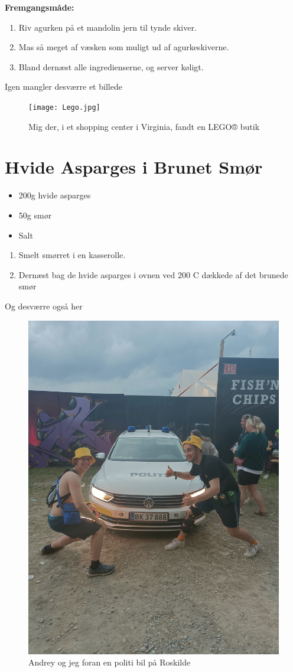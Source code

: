 \documentclass{book}
\begin{document}
\begin{minipage}[t]{0.5\textwidth}
\textbf{Fremgangsmåde:}
\begin{enumerate}
    \item Riv agurken på et mandolin jern til tynde skiver.
    \item Mas så meget af væsken som muligt ud af agurkeskiverne.
    \item Bland dernæst alle ingredienserne, og server køligt.
\end{enumerate}
\end{minipage}
\newpage 
Igen mangler desværre et billede 
\begin{figure}
    \centering
    \texttt{[image: Lego.jpg]}
    \caption{Mig der, i et shopping center i Virginia, fandt en LEGO® butik}
    
\end{figure}
\newpage \section{Hvide Asparges i Brunet Smør}
\begin{minipage}[t]{0.5\textwidth}
\begin{itemize}
    \item 200g hvide asparges 
    \item 50g smør
    \item Salt
\end{itemize}
\end{minipage}
\begin{minipage}[t]{0.5\textwidth}
\begin{enumerate}
    \item Smelt smørret i en kasserolle.
    \item Dernæst bag de hvide asparges i ovnen ved 200 \degree C dækkede af det brunede smør
\end{enumerate}
\end{minipage}
\newpage 
Og desværre også her 
\begin{figure}
    \centering
    \includegraphics[width=0.5\linewidth]{Roskilde.jpg}
    \caption{Andrey og jeg foran en politi bil på Roskilde}
    
\end{figure}
\end{document}
